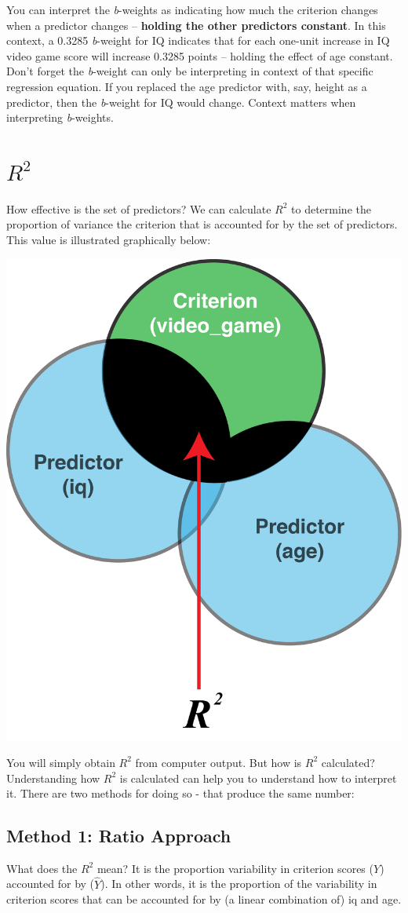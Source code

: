 \documentclass[
]{krantz}
\begin{document}
You can interpret the \emph{b}-weights as indicating how much the criterion changes when a predictor changes -- \textbf{holding the other predictors constant}. In this context, a 0.3285 \emph{b}-weight for IQ indicates that for each one-unit increase in IQ video game score will increase 0.3285 points -- holding the effect of age constant. Don't forget the \emph{b}-weight can only be interpreting in context of that specific regression equation. If you replaced the age predictor with, say, height as a predictor, then the \emph{b}-weight for IQ would change. Context matters when interpreting \emph{b}-weights.

\hypertarget{r2}{%
\section{\texorpdfstring{\(R^2\)}{R\^{}2}}\label{r2}}

How effective is the set of predictors? We can calculate \(R^2\) to determine the proportion of variance the criterion that is accounted for by the set of predictors. This value is illustrated graphically below:

\includegraphics[width=0.26\linewidth]{ch_multiple_regression/images/mr_venn_R2}

You will simply obtain \(R^2\) from computer output. But how is \(R^2\) calculated? Understanding how \(R^2\) is calculated can help you to understand how to interpret it. There are two methods for doing so - that produce the same number:

\hypertarget{method-1-ratio-approach}{%
\subsection{Method 1: Ratio Approach}\label{method-1-ratio-approach}}

What does the \(R^2\) mean? It is the proportion variability in criterion scores (\(Y\)) accounted for by (\(\widehat{Y}\)). In other words, it is the proportion of the variability in criterion scores that can be accounted for by (a linear combination of) iq and age.
\end{document}
